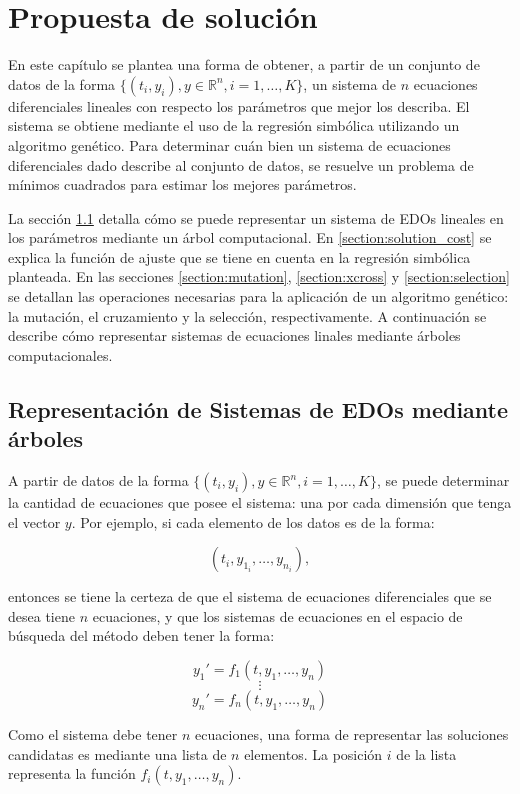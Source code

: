 \chapter{Propuesta de solución}\label{chapter:solution_proposal}

En este capítulo se plantea una forma de obtener, a partir de un conjunto de datos de la forma $\{(t_i, y_i), y \in \mathbb{R}^n, i = 1, \dots, K\}$, un sistema de $n$ ecuaciones diferenciales lineales con respecto los parámetros que mejor los describa. El sistema se obtiene mediante el uso de la regresión simbólica utilizando un algoritmo genético. Para determinar cuán bien un sistema de ecuaciones diferenciales dado describe al conjunto de datos, se resuelve un problema de mínimos cuadrados para estimar los mejores parámetros.

La sección \ref{section:solution_representation} detalla cómo se puede representar un sistema de EDOs lineales en los parámetros mediante un árbol computacional. En \ref{section:solution_cost} se explica la función de ajuste que se tiene en cuenta en la regresión simbólica planteada. En las secciones \ref{section:mutation}, \ref{section:xcross} y \ref{section:selection} se detallan las operaciones necesarias para la aplicación de un algoritmo genético: la mutación, el cruzamiento y la selección, respectivamente. A continuación se describe cómo representar sistemas de ecuaciones linales mediante árboles computacionales.


\section{Representación de Sistemas de EDOs mediante árboles}\label{section:solution_representation}

A partir de datos de la forma $\{(t_i, y_i), y \in \mathbb{R}^n, i = 1, \dots, K\}$, se puede determinar la cantidad de ecuaciones que posee el sistema: una por cada dimensión que tenga el vector $y$. Por ejemplo, si cada elemento de los datos es de la forma:

$$(t_i, y_{1_i}, \dots, y_{n_i}),$$

entonces se tiene la certeza de que el sistema de ecuaciones diferenciales que se desea tiene $n$ ecuaciones, y que los sistemas de ecuaciones en el espacio de búsqueda del método deben tener la forma:

$$y_1' = f_1(t, y_1, \dots, y_n)$$
$$\vdots$$
$$y_n' = f_n(t, y_1, \dots, y_n)$$

Como el sistema debe tener $n$ ecuaciones, una forma de representar las soluciones candidatas es mediante una lista de $n$ elementos. La posición $i$ de la lista representa la función $f_i(t,y_1, \dots, y_n)$.

